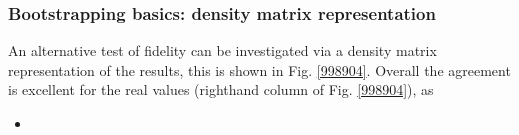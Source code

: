 \subsubsection{Bootstrapping basics: density matrix representation}

An alternative test of fidelity can be investigated via a density matrix representation of the results, this is shown in Fig. \ref{998904}. Overall the agreement is excellent for the real values (righthand column of Fig. \ref{998904}), as 

\begin{itemize}
\item 
\end{itemize}